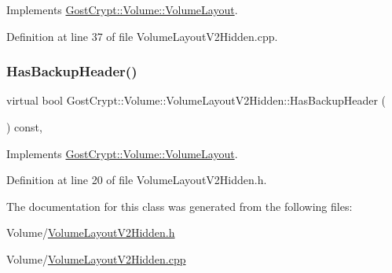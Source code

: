 Implements \hyperlink{class_gost_crypt_1_1_volume_1_1_volume_layout_a55eb89c0c90553250e50138c990bbfac}{Gost\+Crypt\+::\+Volume\+::\+Volume\+Layout}.



Definition at line 37 of file Volume\+Layout\+V2\+Hidden.\+cpp.

\mbox{\label{class_gost_crypt_1_1_volume_1_1_volume_layout_v2_hidden_a6e62bb62c0d5747e089658516d443706}} 
\subsubsection{\texorpdfstring{Has\+Backup\+Header()}{HasBackupHeader()}}
{\footnotesize\ttfamily virtual bool Gost\+Crypt\+::\+Volume\+::\+Volume\+Layout\+V2\+Hidden\+::\+Has\+Backup\+Header (\begin{DoxyParamCaption}{ }\end{DoxyParamCaption}) const\hspace{0.3cm}{\ttfamily [inline]}, {\ttfamily [virtual]}}



Implements \hyperlink{class_gost_crypt_1_1_volume_1_1_volume_layout_a4f88c450f745ca0da3d74700b89d5756}{Gost\+Crypt\+::\+Volume\+::\+Volume\+Layout}.



Definition at line 20 of file Volume\+Layout\+V2\+Hidden.\+h.



The documentation for this class was generated from the following files\+:\begin{DoxyCompactItemize}
\item 
Volume/\hyperlink{_volume_layout_v2_hidden_8h}{Volume\+Layout\+V2\+Hidden.\+h}\item 
Volume/\hyperlink{_volume_layout_v2_hidden_8cpp}{Volume\+Layout\+V2\+Hidden.\+cpp}\end{DoxyCompactItemize}
